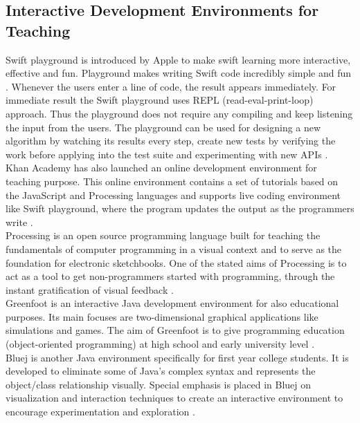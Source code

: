 \subsection{Interactive Development Environments for Teaching}

Swift playground is introduced by Apple to make swift learning more interactive, effective and fun. Playground makes writing Swift code incredibly simple and fun \cite{14}. Whenever the users enter a line of code, the result appears immediately. For immediate result the Swift playground uses REPL (read-eval-print-loop) approach. Thus the playground does not require any compiling and keep listening the input from the users. The playground can be used for designing a new algorithm by watching its results every step, create new tests by verifying the work before applying into the test suite and experimenting with new APIs \cite{13}. \\

Khan Academy has also launched an online development environment for teaching purpose. This online environment contains a set of tutorials based on the JavaScript and Processing languages and supports live coding environment like Swift playground, where the program updates the output as the programmers write \cite{15}. \\

Processing is an open source programming language built for teaching the fundamentals of computer programming in a visual context and to serve as the foundation for electronic sketchbooks. One of the stated aims of Processing is to act as a tool to get non-programmers started with programming, through the instant gratification of visual feedback \cite{16}. \\

Greenfoot is an interactive Java development environment for also educational purposes. Its main focuses are two-dimensional graphical applications like simulations and games. The aim of Greenfoot is to give programming education (object-oriented programming) at high school and early university level \cite{17}. \\

Bluej is another Java environment specifically for first year college students. It is developed to eliminate some of Java's complex syntax and represents the object/class relationship visually. Special emphasis is placed in Bluej on visualization and interaction techniques to create an interactive environment to encourage experimentation and exploration \cite{18}. \\

